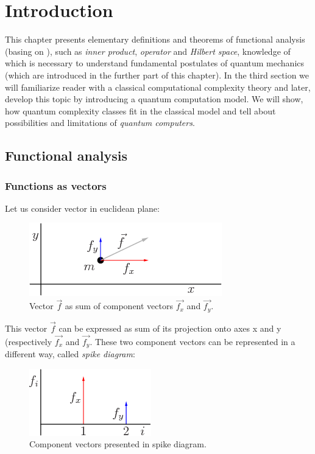 \chapter{Introduction}
\thispagestyle{chapterBeginStyle}
\label{chapter1}

This chapter presents elementary definitions and theorems of functional analysis (basing on \cite{musielak}), such as \textit{inner product}, \textit{operator} and \textit{Hilbert space}, knowledge of which is necessary to understand fundamental postulates of quantum mechanics (which are introduced in the further part of this chapter). In the third section we will familiarize reader with a classical computational complexity theory and later, develop this topic by introducing a quantum computation model. We will show, how quantum complexity classes fit in the classical model and tell about possibilities and limitations of \textit{quantum computers}.

\section{Functional analysis}

\subsection{Functions as vectors}

Let us consider vector in euclidean plane:

\begin{figure}[ht]
\centering
\includegraphics{function_as_vector1}
\caption{Vector $\vec{f}$ as sum of component vectors $\vec{f_x}$ and $\vec{f_y}$.}
\end{figure}

This vector $\vec{f}$ can be expressed as sum of its projection onto axes x and y (respectively $\vec{f_x}$ and $\vec{f_y}$. These two component vectors can be represented in a different way, called \textit{spike diagram}:

\begin{figure}[ht]
\centering
\includegraphics{function_as_vector2}
\caption{Component vectors presented in spike diagram.}
\end{figure}


